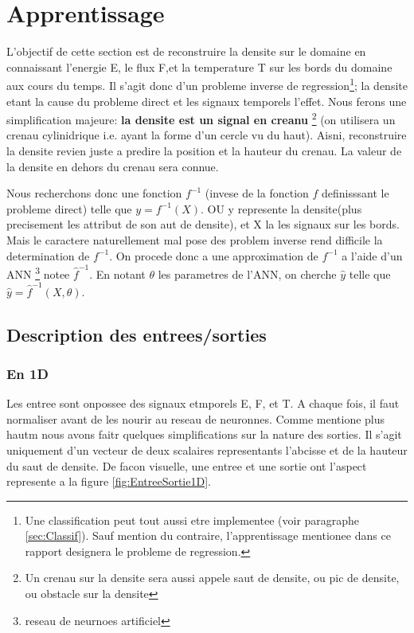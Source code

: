 
\chapter{Apprentissage} %

\label{Chapter4} %

L'objectif de cette section est de reconstruire la densite sur le domaine en connaissant l'energie E, le flux F,et la temperature T sur les bords du domaine aux cours du temps. Il s'agit donc d'un probleme inverse de regression\footnote{Une classification peut tout aussi etre implementee (voir paragraphe \ref{sec:Classif}). Sauf mention du contraire, l'apprentissage mentionee dans ce rapport designera le probleme de regression.}; la densite etant la cause du probleme direct et les signaux temporels l'effet. Nous ferons une simplification majeure: \textbf{la densite est un signal en creanu} \footnote{Un crenau sur la densite sera aussi appele saut de densite, ou pic de densite, ou obstacle sur la densite} (on utilisera un crenau cylinidrique i.e. ayant la forme d'un cercle vu du haut). Aisni, reconstruire la densite revien juste a predire la position et la hauteur du crenau. La valeur de la densite en dehors du crenau sera connue. 

Nous recherchons donc une fonction $f^{-1}$ (invese de la fonction $f$ definisssant le probleme direct) telle que $y = f^{-1}(X)$. OU y represente la densite(plus precisement les attribut de son aut de densite), et X la les signaux sur les bords. Mais le caractere naturellement mal pose des problem inverse rend difficile la determination de $f^{-1}$. On procede donc a une approximation de $f^{-1}$ a l'aide d'un ANN \footnote{reseau de neurnoes artificiel } notee $\hat{f}^{-1}$. En notant $\theta$ les parametres de l'ANN, on cherche $\hat{y}$ telle que $ \hat{y} = \hat{f}^{-1}(X, \theta). $


\section{Description des entrees/sorties}

\subsection{En 1D}
Les entree sont onpossee des signaux etmporels E, F, et T. A chaque fois, il faut normaliser avant de les nourir au reseau de neuronnes. Comme mentione plus hautm nous avons faitr quelques simplifications sur la nature des sorties. Il s'agit uniquement d'un vecteur de deux scalaires representants l'abcisse et de la hauteur du saut de densite. De facon visuelle, une entree et une sortie ont l'aspect represente a la figure \ref{fig:EntreeSortie1D}.

